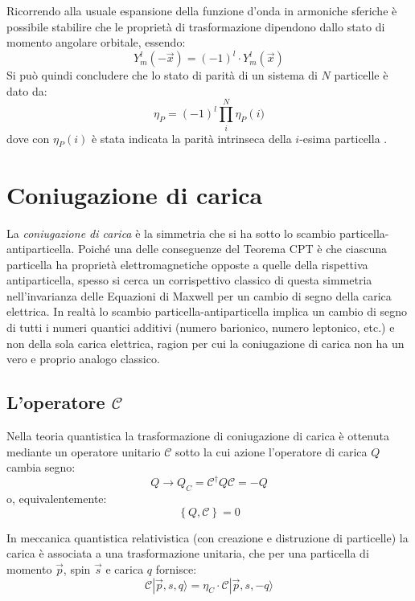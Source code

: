 Ricorrendo alla usuale espansione della funzione d'onda in armoniche sferiche è possibile stabilire che le propriet\`a di trasformazione dipendono dallo stato di momento angolare orbitale, essendo:
\begin{equation}
Y^l_m\left( -\vec{x} \right) = \left( -1 \right)^l \cdot Y^l_m\left( \vec{x} \right)
\end{equation}
Si può quindi concludere che lo stato di parità di un sistema di $N$ particelle è dato da: 
\begin{equation}
\eta _P = \left( -1 \right)^l \prod_i^N \eta _P\left(i)\right.  
\end{equation}
dove con $\eta _P\left(i\right) $ è stata indicata la parità intrinseca della $i$-esima particella \cite{Sozzi}.

\section{Coniugazione di carica}
\noindent
La \emph{coniugazione di carica} è la simmetria che si ha sotto lo scambio particella-antiparticella. Poiché una delle conseguenze del
Teorema CPT è che ciascuna particella ha proprietà elettromagnetiche opposte a quelle della rispettiva antiparticella, spesso si cerca un 
corrispettivo classico di questa simmetria nell'invarianza delle Equazioni di Maxwell per un cambio di segno della carica elettrica.
In realtà lo scambio particella-antiparticella implica un cambio di segno di tutti i numeri quantici additivi (numero barionico, numero leptonico, etc.) 
e non della sola carica elettrica, ragion per cui la coniugazione di carica non ha un vero e proprio analogo classico\cite{Sozzi}.

\subsection{L'operatore $\mathscr{C}$} 
\noindent
Nella teoria quantistica la trasformazione di coniugazione di carica è ottenuta mediante un operatore unitario $\mathscr{C}$ sotto la cui azione l'operatore di 
carica $Q$ cambia segno:
\begin{equation}
Q \rightarrow Q_C =\mathscr{C}^{\dag} Q \mathscr{C} = -Q
\end{equation}
o, equivalentemente:
\begin{equation}
\left\{Q,\mathscr{C} \right \} = 0
\end{equation}

In meccanica quantistica relativistica (con creazione e distruzione di particelle) la carica \`e associata a una trasformazione unitaria, che per una particella di momento $\vec{p}$, spin $\vec{s}$ e carica $q$ fornisce:
\begin{equation}
\mathscr{C} | \vec{p},s,q \rangle = \eta_C \cdot \mathscr{C} | \vec{p},s,-q \rangle
\end{equation}

